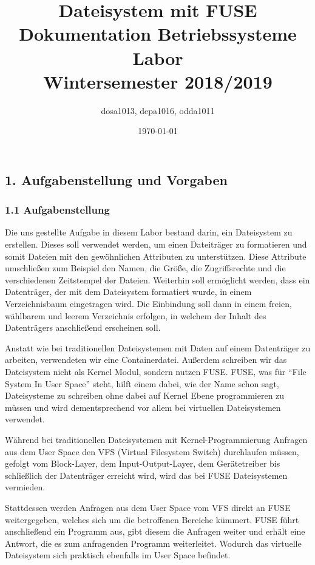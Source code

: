 \documentclass[]{article}
\title{Dateisystem mit FUSE \\
  \large Dokumentation Betriebssysteme Labor \\
  \large Wintersemester 2018/2019}
\author{dosa1013, depa1016, odda1011}
\date{\today}
\begin{document}
\maketitle
\tableofcontents

\newpage

\hypertarget{aufgabenstellung-und-vorgaben}{%
\subsection{1. Aufgabenstellung und
Vorgaben}\label{aufgabenstellung-und-vorgaben}}

\hypertarget{aufgabenstellung}{%
\subsubsection{1.1 Aufgabenstellung}\label{aufgabenstellung}}

Die uns gestellte Aufgabe in diesem Labor bestand darin, ein Dateisystem
zu erstellen. Dieses soll verwendet werden, um einen Dateiträger zu
formatieren und somit Dateien mit den gewöhnlichen Attributen zu
unterstützen. Diese Attribute umschließen zum Beispiel den Namen, die
Größe, die Zugriffsrechte und die verschiedenen Zeitstempel der Dateien.
Weiterhin soll ermöglicht werden, dass ein Datenträger, der mit dem
Dateisystem formatiert wurde, in einem Verzeichnisbaum eingetragen wird.
Die Einbindung soll dann in einem freien, wählbarem und leerem
Verzeichnis erfolgen, in welchem der Inhalt des Datenträgers
anschließend erscheinen soll.

Anstatt wie bei traditionellen Dateisystemen mit Daten auf einem
Datenträger zu arbeiten, verwendeten wir eine Containerdatei. Außerdem
schreiben wir das Dateisystem nicht als Kernel Modul, sondern nutzen
FUSE. FUSE, was für ``File System In User Space'' steht, hilft einem
dabei, wie der Name schon sagt, Dateisysteme zu schreiben ohne dabei auf
Kernel Ebene programmieren zu müssen und wird dementsprechend vor allem
bei virtuellen Dateisystemen verwendet.

Während bei traditionellen Dateisystemen mit Kernel-Programmierung
Anfragen aus dem User Space den VFS (Virtual Filesystem Switch)
durchlaufen müssen, gefolgt vom Block-Layer, dem Input-Output-Layer, dem
Gerätetreiber bis schließlich der Datenträger erreicht wird, wird das
bei FUSE Dateisystemen vermieden.

Stattdessen werden Anfragen aus dem User Space vom VFS direkt an FUSE
weitergegeben, welches sich um die betroffenen Bereiche kümmert. FUSE
führt anschließend ein Programm aus, gibt diesem die Anfragen weiter und
erhält eine Antwort, die es zum anfragenden Programm weiterleitet.
Wodurch das virtuelle Dateisystem sich praktisch ebenfalls im User Space
befindet.
\end{document}
